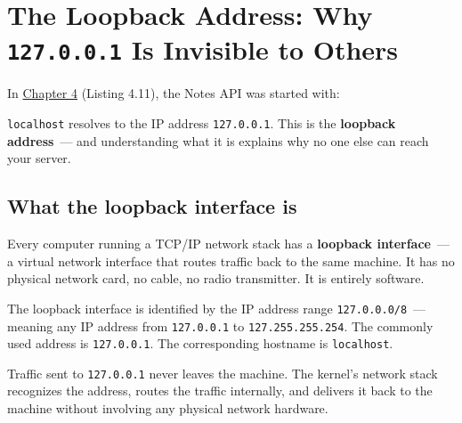 \setcounter{section}{0}
\section{\texorpdfstring{The Loopback Address: Why \texttt{127.0.0.1} Is Invisible to Others}{The Loopback Address: Why 127.0.0.1 Is Invisible to Others}}\label{10-networking-limitations:101-the-loopback-address-why-127001-is-invisible-to-others}

In \hyperref[ch:04-request-handling-paths]{Chapter 4} (Listing 4.11), the Notes API was started with:

\begin{codebox}[short]

\begin{Shaded}
\begin{Highlighting}[]
\OperatorTok{=}\OperatorTok{=}\OperatorTok{=}\NormalTok{)}
\end{Highlighting}
\end{Shaded}

\end{codebox}

\noindent{}\texttt{localhost} resolves to the IP address \texttt{127.0.0.1}. This is the \textbf{loopback address}~--- and understanding what it is explains why no one else can reach your server.

\subsection*{What the loopback interface is}\label{10-networking-limitations:what-the-loopback-interface-is}

Every computer running a TCP/IP network stack has a \textbf{loopback interface}~--- a virtual network interface that routes traffic back to the same machine. It has no physical network card, no cable, no radio transmitter. It is entirely software.

The loopback interface is identified by the IP address range \texttt{127.0.0.0/8}~--- meaning any IP address from \texttt{127.0.0.1} to \texttt{127.255.255.254}. The commonly used address is \texttt{127.0.0.1}. The corresponding hostname is \texttt{localhost}.

Traffic sent to \texttt{127.0.0.1} never leaves the machine. The kernel's network stack recognizes the address, routes the traffic internally, and delivers it back to the machine without involving any physical network hardware.

